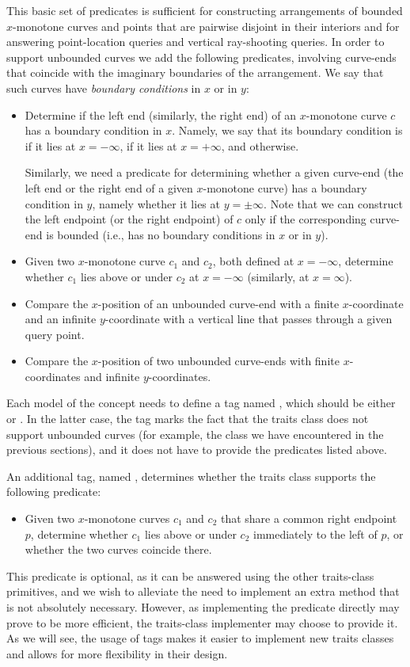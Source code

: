 This basic set of predicates is sufficient for constructing
arrangements of bounded $x$-monotone curves and points that
are pairwise disjoint in their interiors and for answering
point-location queries and vertical ray-shooting queries.
In order to support unbounded curves we add the following
predicates, involving curve-ends that coincide with the imaginary
boundaries of the arrangement. We say that such curves have
{\em boundary conditions} in $x$ or in $y$: 
\begin{itemize}
\item
Determine if the left end (similarly, the right end) of an
$x$-monotone curve $c$ has a boundary condition in $x$. Namely,
we say that its boundary condition is  if
it lies at $x = -\infty$,  if it lies at
$x = +\infty$, and  otherwise.

Similarly, we need a predicate for determining whether a given
curve-end (the left end or the right end of a given $x$-monotone
curve) has a boundary condition in $y$, namely whether it lies
at $y = \pm\infty$. Note that we can construct the left endpoint
(or the right endpoint) of $c$ only if the corresponding curve-end
is bounded (i.e., has no boundary conditions in $x$ or in $y$).
%
\item
Given two $x$-monotone curve $c_1$ and $c_2$, both defined at $x =
-\infty$, determine whether $c_1$ lies above or under $c_2$ at $x =
-\infty$ (similarly, at $x = \infty$).
%
\item
Compare the $x$-position of an unbounded curve-end with a
finite $x$-coordinate and an infinite $y$-coordinate with a
vertical line that passes through a given query point.
%
\item
Compare the $x$-position of two unbounded curve-ends with finite
$x$-coordinates and infinite $y$-coordinates.
\end{itemize}
Each model of the concept 
needs to define a tag named ,
which should be either  or .
In the latter case, the tag marks the fact that the traits
class does not support unbounded curves (for example, the
 class we have encountered in the
previous sections), and it does not have to provide the
predicates listed above.

An additional tag, named , determines
whether the traits class supports the following predicate:
\begin{itemize}
\item
Given two $x$-monotone curves $c_1$ and $c_2$ that share a common
right endpoint $p$, determine whether $c_1$ lies above or under
$c_2$ immediately to the left of $p$, or whether the two curves
coincide there.
\end{itemize}
This predicate is optional, as it can be answered using the
other traits-class primitives, and we wish to alleviate the
need to implement an extra method that is not absolutely
necessary. However, as implementing the predicate directly
may prove to be more efficient, the traits-class
implementer may choose to provide it. As we will see, the
usage of tags makes it easier to implement new traits
classes and allows for more flexibility in their design.

